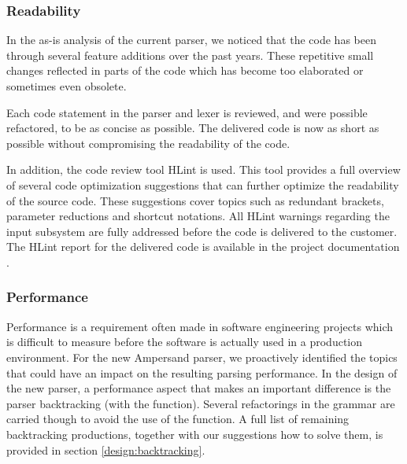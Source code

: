 \subsubsection{Readability}
  In the as-is analysis of the current parser, we noticed that the code has been through several feature additions over the past years.
  These repetitive small changes reflected in parts of the code which has become too elaborated or sometimes even obsolete.

  Each code statement in the parser and lexer is reviewed, and were possible refactored, to be as concise as possible.
  The delivered code is now as short as possible without compromising the readability of the code.

  In addition, the code review tool HLint is used.
  This tool provides a full overview of several code optimization suggestions that can further optimize the readability of the source code. 
  These suggestions cover topics such as redundant brackets, parameter reductions and shortcut notations.
  All HLint warnings regarding the input subsystem are fully addressed before the code is delivered to the customer.
  The HLint report for the delivered code is available in the project documentation .

\subsubsection{Performance}
  Performance is a requirement often made in software engineering projects which is difficult to measure before the software is actually used in a production environment.
  For the new Ampersand parser, we proactively identified the topics that could have an impact on the resulting parsing performance.
  In the design of the new parser, a performance aspect that makes an important difference is the parser backtracking (with the  function).
  Several refactorings in the grammar are carried though to avoid the use of the  function. 
  A full list of remaining backtracking productions, together with our suggestions how to solve them, is provided in section \autoref{design:backtracking}.
